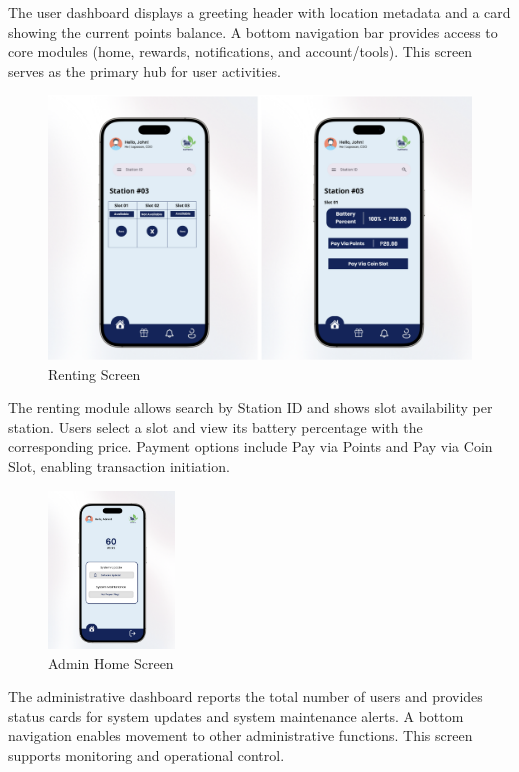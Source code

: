 {  The user dashboard displays a greeting header with location metadata and a card showing the current points balance. A bottom navigation bar provides access to core modules (home, rewards, notifications, and account/tools). This screen serves as the primary hub for user activities.
  
    \begin{figure}[H]
  	\centering
  	\caption{Renting Screen}
  	\label{fig:renting}
  	\includegraphics[width=1\textwidth]{figures/renting.png}
  \end{figure}
  
  The renting module allows search by Station ID and shows slot availability per station. Users select a slot and view its battery percentage with the corresponding price. Payment options include Pay via Points and Pay via Coin Slot, enabling transaction initiation.
  
  \begin{figure}[H]
  	\centering
  	\caption{Admin Home  Screen}
  	\label{fig:admin}
  	\includegraphics[width=0.3\textwidth]{figures/admin.png}
  \end{figure}
  
  The administrative dashboard reports the total number of users and provides status cards for system updates and system maintenance alerts. A bottom navigation enables movement to other administrative functions. This screen supports monitoring and operational control.
  
}
